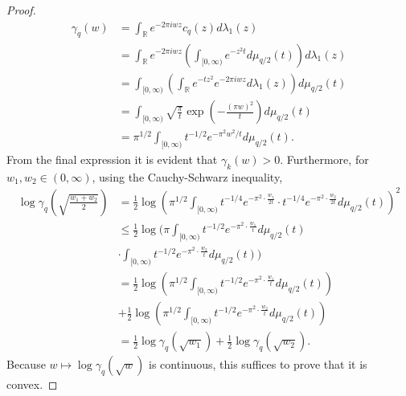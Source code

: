 \documentclass{article}
\theoremstyle{definition}
\begin{document}
\begin{proof}
\begin{align*}
\gamma_q(w)&=\int_\mathbb{R} e^{-2\pi iwz} c_q(z) d\lambda_1(z)\\
&=\int_\mathbb{R} e^{-2\pi iwz} \left( \int_{[0,\infty)} e^{-z^2 t}  d\mu_{q/2}(t)\right) d\lambda_1(z)\\
&=\int_{[0,\infty)}  \left( \int_{\mathbb{R}}  e^{-t z^2}e^{-2\pi iwz} d\lambda_1(z)\right) d\mu_{q/2}(t)\\
&=\int_{[0,\infty)} \sqrt{\frac{\pi}{t}} \exp\left(-\frac{(\pi w)^2}{t} \right)d\mu_{q/2}(t)\\
&=\pi^{1/2} \int_{[0,\infty)} t^{-1/2} e^{-\pi^2 w^2/t} d\mu_{q/2}(t).
\end{align*}
From the final expression it is evident that $\gamma_k(w) > 0$. 
Furthermore, for $w_1,w_2 \in (0,\infty)$, using the Cauchy-Schwarz inequality,
\begin{align*}
\log \gamma_q\left( \sqrt{\frac{w_1+w_2}{2}}\right)&=\frac{1}{2} \log  
 \left(\pi^{1/2}  \int_{[0,\infty)} t^{-1/4} e^{-\pi^2 \cdot \frac{w_1}{2t}}  \cdot t^{-1/4}
 e^{-\pi^2 \cdot \frac{w_2}{2t}} 
 d\mu_{q/2}(t)\right)^2\\
 &\leq \frac{1}{2} \log \bigg( \pi    \int_{[0,\infty)} t^{-1/2} e^{-\pi^2 \cdot \frac{w_1}{t}}  
 d\mu_{q/2}(t)\\
 &\cdot  \int_{[0,\infty)} t^{-1/2} e^{-\pi^2 \cdot \frac{w_2}{t}}  
 d\mu_{q/2}(t) \bigg)\\
 &=\frac{1}{2} \log \left( \pi^{1/2}   \int_{[0,\infty)} t^{-1/2} e^{-\pi^2 \cdot \frac{w_1}{t}}  
 d\mu_{q/2}(t)\right)\\
 &+\frac{1}{2} \log \left( \pi^{1/2}   \int_{[0,\infty)} t^{-1/2} e^{-\pi^2 \cdot \frac{w_2}{t}}  
 d\mu_{q/2}(t)\right)\\
 &=\frac{1}{2} \log \gamma_q(\sqrt{w_1})+\frac{1}{2} \log \gamma_q(\sqrt{w_2}).
\end{align*}
Because $w \mapsto \log \gamma_q(\sqrt{w})$ is continuous, this suffices to prove that it is convex.
\end{proof}
\end{document}
